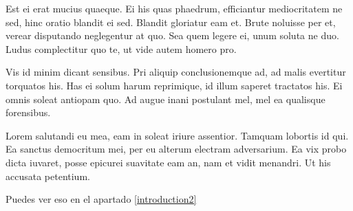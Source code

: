 \documentclass[a4paper, 11pt, titlepage, twocolumn]{book}
\begin{document}
Est ei erat mucius quaeque. Ei his quas phaedrum, efficiantur mediocritatem ne sed, hinc oratio blandit ei sed. Blandit gloriatur eam et. Brute noluisse per et, verear disputando neglegentur at quo. Sea quem legere ei, unum soluta ne duo. Ludus complectitur quo te, ut vide autem homero pro.

Vis id minim dicant sensibus. Pri aliquip conclusionemque ad, ad malis evertitur torquatos his. Has ei solum harum reprimique, id illum saperet tractatos his. Ei omnis soleat antiopam quo. Ad augue inani postulant mel, mel ea qualisque forensibus.

Lorem salutandi eu mea, eam in soleat iriure assentior. Tamquam lobortis id qui. Ea sanctus democritum mei, per eu alterum electram adversarium. Ea vix probo dicta iuvaret, posse epicurei suavitate eam an, nam et vidit menandri. Ut his accusata petentium.

Puedes ver eso en el apartado \ref{introduction2}  
\end{document}
